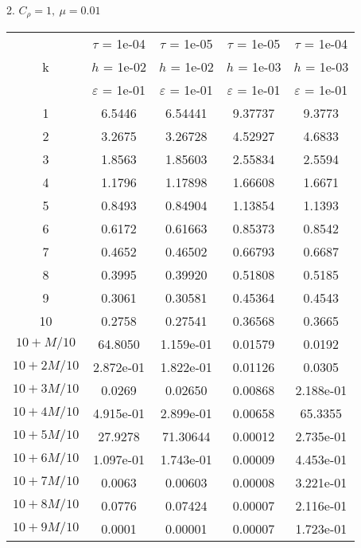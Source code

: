 2. $C_{\rho} = 1, \ \mu = 0.01$
\begin{center}
	\begin{tabular}{ |c|c|c|c|c| } 
		\hline
		& $\tau$ = 1e-04 & $\tau$ = 1e-05 & $\tau$ = 1e-05 & $\tau$ = 1e-04 \\ 
		k & $h$ = 1e-02 & $h$ = 1e-02 & $h$ = 1e-03 & $h$ = 1e-03 \\ 
		& $\varepsilon$ = 1e-01 & $\varepsilon$ = 1e-01 & $\varepsilon$ = 1e-01 & $\varepsilon$ = 1e-01 \\ 
		\hline
		1 & 6.5446 & 6.54441 & 9.37737 & 9.3773 \\
		\hline
		2 & 3.2675 & 3.26728 & 4.52927 & 4.6833 \\
		\hline
		3 & 1.8563 & 1.85603 & 2.55834 & 2.5594 \\
		\hline
		4 & 1.1796 & 1.17898 & 1.66608 & 1.6671 \\
		\hline
		5 & 0.8493 & 0.84904 & 1.13854 & 1.1393 \\
		\hline
		6 & 0.6172 & 0.61663 & 0.85373 & 0.8542 \\
		\hline
		7 & 0.4652 & 0.46502 & 0.66793 & 0.6687 \\
		\hline
		8 & 0.3995 & 0.39920 & 0.51808 & 0.5185 \\
		\hline
		9 & 0.3061 & 0.30581 & 0.45364 & 0.4543 \\
		\hline
		10 & 0.2758 & 0.27541 & 0.36568 & 0.3665 \\
		\hline
		$10 + M/10$ & 64.8050 & 1.159e-01 & 0.01579 & 0.0192 \\
		\hline
		$10 + 2M/10$ & 2.872e-01 & 1.822e-01 & 0.01126 & 0.0305 \\
		\hline
		$10 + 3M/10$ & 0.0269 & 0.02650 & 0.00868 & 2.188e-01 \\
		\hline
		$10 + 4M/10$ & 4.915e-01 & 2.899e-01 & 0.00658 & 65.3355 \\
		\hline
		$10 + 5M/10$ & 27.9278 & 71.30644 & 0.00012 & 2.735e-01 \\
		\hline
		$10 + 6M/10$ & 1.097e-01 & 1.743e-01 & 0.00009 & 4.453e-01 \\
		\hline
		$10 + 7M/10$ & 0.0063 & 0.00603 & 0.00008 & 3.221e-01 \\
		\hline
		$10 + 8M/10$ & 0.0776 & 0.07424 & 0.00007 & 2.116e-01 \\
		\hline
		$10 + 9M/10$ & 0.0001 & 0.00001 & 0.00007 & 1.723e-01 \\
		\hline
	\end{tabular}
\end{center}


